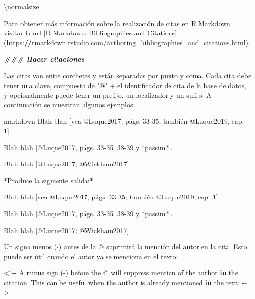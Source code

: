 \documentclass[11pt,a4paper,oneside,]{article}
\newenvironment{Shaded}{\begin{snugshade}}{\end{snugshade}}
\newcommand{\AttributeTok}[1]{\textcolor[rgb]{0.77,0.63,0.00}{#1}}
\newcommand{\ControlFlowTok}[1]{\textcolor[rgb]{0.13,0.29,0.53}{\textbf{#1}}}
\newcommand{\DecValTok}[1]{\textcolor[rgb]{0.00,0.00,0.81}{#1}}
\newcommand{\DocumentationTok}[1]{\textcolor[rgb]{0.56,0.35,0.01}{\textbf{\textit{#1}}}}
\newcommand{\ErrorTok}[1]{\textcolor[rgb]{0.64,0.00,0.00}{\textbf{#1}}}
\newcommand{\FunctionTok}[1]{\textcolor[rgb]{0.00,0.00,0.00}{#1}}
\newcommand{\NormalTok}[1]{#1}
\newcommand{\OtherTok}[1]{\textcolor[rgb]{0.56,0.35,0.01}{#1}}
\newcommand{\SpecialCharTok}[1]{\textcolor[rgb]{0.00,0.00,0.00}{#1}}
\newcommand{\StringTok}[1]{\textcolor[rgb]{0.31,0.60,0.02}{#1}}
\numberwithin{dummy}{section}
\theoremstyle{ocrenumbox}
\theoremstyle{blacknumex}
\theoremstyle{blacknumbox}
\theoremstyle{ocrenum}
\theoremstyle{ocrenum}
\begin{document}
\begin{Shaded}
\begin{Highlighting}[numbers=left,,firstnumber=1101,]
\NormalTok{\textbackslash{}normalsize}


\NormalTok{Para obtener más información sobre la realización de citas en R Markdown visitar la url [R Markdown}\SpecialCharTok{:}\NormalTok{ Bibliographies and Citations](https}\SpecialCharTok{:}\ErrorTok{//}\NormalTok{rmarkdown.rstudio.com}\SpecialCharTok{/}\NormalTok{authoring\_bibliographies\_and\_citations.html).}

\DocumentationTok{\#\#\# Hacer citaciones}

\NormalTok{Las citas van entre corchetes y están separadas por punto y coma. Cada cita debe tener una clave, compuesta de }\StringTok{"\textasciigrave{}@\textasciigrave{}"} \SpecialCharTok{+}\NormalTok{ el identificador de cita de la base de datos, y opcionalmente puede tener un prefijo, un localizador y un sufijo. A continuación  se muestran algunos ejemplos}\SpecialCharTok{:}

\StringTok{\textasciigrave{}\textasciigrave{}\textasciigrave{}}\AttributeTok{markdown}
\AttributeTok{Blah blah [vea @Luque2017, págs. 33{-}35; también @Luque2019, cap. 1].}

\AttributeTok{Blah blah [@Luque2017, págs. 33{-}35, 38{-}39 y *passim*].}

\AttributeTok{Blah blah [@Luque2017; @Wickham2017].}
\StringTok{\textasciigrave{}\textasciigrave{}\textasciigrave{}}

\SpecialCharTok{*}\NormalTok{Produce la siguiente salida}\SpecialCharTok{:}\ErrorTok{*}

\NormalTok{Blah blah [vea }\SpecialCharTok{@}\NormalTok{Luque2017, págs. }\DecValTok{33{-}35}\NormalTok{; también }\SpecialCharTok{@}\NormalTok{Luque2019, cap. }\DecValTok{1}\NormalTok{].}

\NormalTok{Blah blah [}\SpecialCharTok{@}\NormalTok{Luque2017, págs. }\DecValTok{33{-}35}\NormalTok{, }\DecValTok{38{-}39}\NormalTok{ y }\SpecialCharTok{*}\NormalTok{passim}\SpecialCharTok{*}\NormalTok{].}

\NormalTok{Blah blah [}\SpecialCharTok{@}\NormalTok{Luque2017; }\SpecialCharTok{@}\NormalTok{Wickham2017].}


\NormalTok{Un signo }\FunctionTok{menos}\NormalTok{ (}\SpecialCharTok{{-}}\NormalTok{) antes de la }\SpecialCharTok{@}\NormalTok{ suprimirá la mención del autor en la cita. Esto puede ser útil cuando el autor ya se menciona en el texto}\SpecialCharTok{:}

\ErrorTok{\textless{}}\SpecialCharTok{!{-}{-}}\NormalTok{ A minus }\FunctionTok{sign}\NormalTok{ (}\SpecialCharTok{{-}}\NormalTok{) before the }\SpecialCharTok{@}\NormalTok{ will suppress mention of the author }\ControlFlowTok{in}\NormalTok{ the citation. This can be useful when the author is already mentioned }\ControlFlowTok{in}\NormalTok{ the text}\SpecialCharTok{:} \SpecialCharTok{{-}}\OtherTok{{-}\textgreater{}}


\end{Highlighting}
\end{Shaded}
\end{document}
